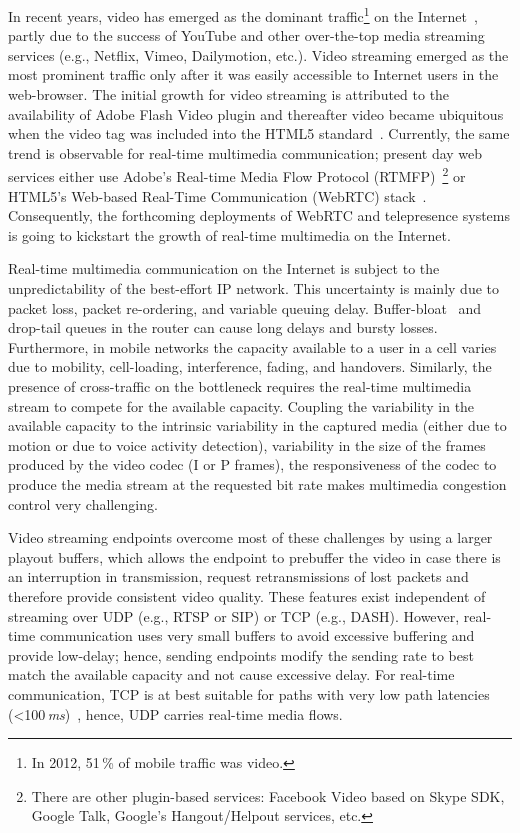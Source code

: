 In recent years, video has emerged as the dominant traffic\footnote{In 2012,
51\,\% of mobile traffic was video.} on the Internet~\cite{cvni.13,dawn.zb},
partly due to the success of YouTube and other over-the-top media streaming
services (e.g., Netflix, Vimeo, Dailymotion, etc.). Video streaming emerged as
the most prominent traffic only after it was easily accessible to Internet
users in the web-browser. The initial growth for video streaming is attributed
to the availability of Adobe Flash Video plugin and thereafter video became
ubiquitous when the video tag was included into the HTML5
standard~\cite{html5-spec}. Currently, the same trend is observable for real-time 
multimedia communication; present day web services either use Adobe's 
Real-time Media Flow Protocol (RTMFP)~\cite{draft.rtmfp}\footnote{There are other 
plugin-based services: Facebook Video based on Skype SDK, Google Talk, Google's
Hangout/Helpout services, etc.} or HTML5's Web-based Real-Time Communication
(WebRTC) stack~\cite{draft.webrtc}. Consequently, the forthcoming deployments
of WebRTC and telepresence systems is going to kickstart the growth of 
real-time multimedia on the Internet.


Real-time multimedia communication on the Internet is subject to the
unpredictability of the best-effort IP network. This uncertainty is mainly due
to packet loss, packet re-ordering, and variable queuing delay. 
Buffer-bloat~\cite{gettys:bufferbloat} and drop-tail queues in the router 
can cause long delays and bursty losses. Furthermore, in mobile networks 
the capacity available to a user in a cell varies due to mobility, cell-loading,
interference, fading, and handovers. Similarly, the presence of cross-traffic on
the bottleneck requires the real-time multimedia stream to compete for the 
available capacity. Coupling the variability in the available capacity to 
the intrinsic variability in the captured media (either due to motion or due 
to voice activity detection), variability in the size of the frames produced 
by the video codec (I or P frames), the responsiveness of the codec to produce 
the media stream at the requested bit rate makes multimedia congestion control
very challenging. 

Video streaming endpoints overcome most of these challenges by using a larger
playout buffers, which allows the endpoint to prebuffer the video in case
there is an interruption in transmission, request retransmissions of lost
packets and therefore provide consistent video quality. These features exist
independent of streaming over UDP (e.g., RTSP or SIP) or TCP (e.g., DASH).
However, real-time communication uses very small buffers to avoid excessive
buffering and provide low-delay; hence, sending endpoints modify the sending
rate to best match the available capacity and not cause excessive delay. For
real-time communication, TCP is at best suitable for paths with very low path
latencies (<100\,\emph{ms})~\cite{Brosh:tcp-real-time}, hence, UDP carries
real-time media flows.

